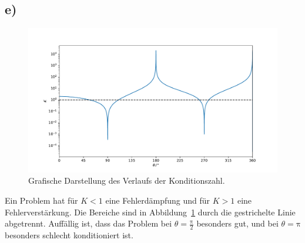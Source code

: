 \documentclass[a4paper, 11pt]{article}
\begin{document}
\subsection*{e)}
\begin{figure}
    \centering
    \includegraphics[width=\textwidth]{../A04/A4_kond.pdf}
    \caption{Grafische Darstellung des Verlaufs der Konditionszahl.}
    \label{fig:K}
\end{figure}
Ein Problem hat für $K<1$ eine Fehlerdämpfung und für $K>1$ eine Fehlerverstärkung.
Die Bereiche sind in Abbildung~\ref{fig:K} durch die gestrichelte Linie abgetrennt.
Auffällig ist, dass das Problem bei $\theta = \frac{\mathrm{\pi}}{2}$ besonders gut, und bei $\theta = \mathrm{\pi}$ besonders schlecht konditioniert ist.
\end{document}

